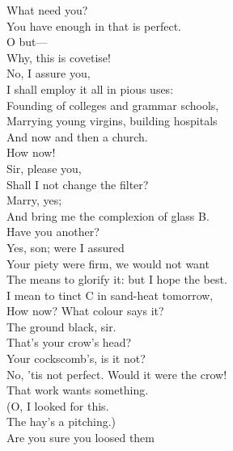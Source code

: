 \documentclass[a4paper,oneside,12pt]{memoir}
\begin{document}
\begin{drama*}
\subtlespeaks {} What need you?\\
You have enough in that is perfect.\\
\mammonspeaks {} O but---\\
\subtlespeaks Why, this is covetise!\\
\mammonspeaks {} No, I assure you,\\
I shall employ it all in pious uses:\\
Founding of colleges and grammar schools,\\
Marrying young virgins, building hospitals\\
And now and then a church.\\
\subtlespeaks {} How now!\\
\facespeaks {} Sir, please you,\\
Shall I not change the filter?\\
\subtlespeaks {} Marry, yes;\\
And bring me the complexion of glass B.\\
\mammonspeaks Have you another?\\
\subtlespeaks {} Yes, son; were I assured\\
Your piety were firm, we would not want\\
The means to glorify it: but I hope the best.\\
I mean to tinct C in sand-heat tomorrow,\\
How now? What colour says it?\\
\facespeaks {} The ground black, sir.\\
\mammonspeaks That's your crow's head?\\
\surlyspeaks {} Your cockscomb's, is it not?\\
\subtlespeaks No, 'tis not perfect. Would it were the crow!\\
That work wants something.\\
\surlyspeaks {} (O, I looked for this.\\
The hay's a pitching.)\\
\subtlespeaks {} Are you sure you loosed them\\

\end{drama*}
\end{document}
